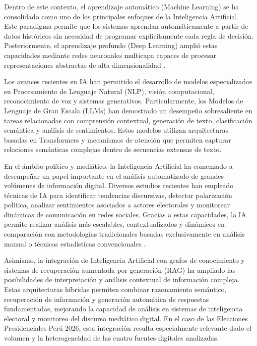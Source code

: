 Dentro de este contexto, el aprendizaje automático (Machine Learning) se ha consolidado como uno de los principales enfoques de la Inteligencia Artificial. Este paradigma permite que los sistemas aprendan automáticamente a partir de datos históricos sin necesidad de programar explícitamente cada regla de decisión. Posteriormente, el aprendizaje profundo (Deep Learning) amplió estas capacidades mediante redes neuronales multicapa capaces de procesar representaciones abstractas de alta dimensionalidad \parencite{bk_russell2004intart}.

Los avances recientes en IA han permitido el desarrollo de modelos especializados en Procesamiento de Lenguaje Natural (NLP), visión computacional, reconocimiento de voz y sistemas generativos. Particularmente, los Modelos de Lenguaje de Gran Escala (LLMs) han demostrado un desempeño sobresaliente en tareas relacionadas con comprensión contextual, generación de texto, clasificación semántica y análisis de sentimientos. Estos modelos utilizan arquitecturas basadas en Transformers y mecanismos de atención que permiten capturar relaciones semánticas complejas dentro de secuencias extensas de texto.

En el ámbito político y mediático, la Inteligencia Artificial ha comenzado a desempeñar un papel importante en el análisis automatizado de grandes volúmenes de información digital. Diversos estudios recientes han empleado técnicas de IA para identificar tendencias discursivas, detectar polarización política, analizar sentimientos asociados a actores electorales y monitorear dinámicas de comunicación en redes sociales. Gracias a estas capacidades, la IA permite realizar análisis más escalables, contextualizados y dinámicos en comparación con metodologías tradicionales basadas exclusivamente en análisis manual o técnicas estadísticas convencionales \parencite{bk_russell2004intart}.

Asimismo, la integración de Inteligencia Artificial con grafos de conocimiento y sistemas de recuperación aumentada por generación (RAG) ha ampliado las posibilidades de interpretación y análisis contextual de información compleja. Estas arquitecturas híbridas permiten combinar razonamiento semántico, recuperación de información y generación automática de respuestas fundamentadas, mejorando la capacidad de análisis en sistemas de inteligencia electoral y monitoreo del discurso mediático digital. En el caso de las Elecciones Presidenciales Perú 2026, esta integración resulta especialmente relevante dado el volumen y la heterogeneidad de las cuatro fuentes digitales analizadas.

